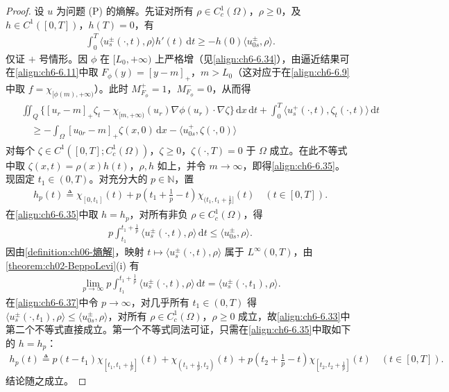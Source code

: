 \documentclass[../../main.tex]{subfiles}%
\begin{document}
\begin{proof}
设 $u$ 为问题 (P) 的熵解。先证对所有 $\rho\in C^1_c(\Omega)$，$\rho\geqslant0$，及 $h\in C^1([0,T])$，$h(T)=0$，有
\begin{align}
\int_0^T\langle u^\pm_s(\cdot,t),\rho\rangle h'(t)\,\mathrm{d}t\geqslant-h(0)\langle u^\pm_{0s},\rho\rangle. \label{align:ch6-6.35}
\end{align}
仅证 $+$ 号情形。因 $\phi$ 在 $[L_0,+\infty)$ 上严格增（见\eqref{align:ch6-6.34}），由逼近结果可在\eqref{align:ch6-6.11}中取 $F_\phi(y)=[y-m]_+$，$m>L_0$（这对应于在\eqref{align:ch6-6.9}中取 $f=\chi_{[\phi(m),+\infty)}$）。此时 $M^+_{F_\phi}=1$，$M^-_{F_\phi}=0$，从而得
\begin{align}
\begin{aligned}
&\iint_Q\{[u_r-m]_+\zeta_t-\chi_{[m,+\infty)}(u_r)\nabla\phi(u_r)\cdot\nabla\zeta\}\,\mathrm{d}x\,\mathrm{d}t
+\int_0^T\langle u^+_s(\cdot,t),\zeta_t(\cdot,t)\rangle\,\mathrm{d}t\\
&\quad\geqslant-\int_\Omega[u_{0r}-m]_+\zeta(x,0)\,\mathrm{d}x-\langle u^+_{0s},\zeta(\cdot,0)\rangle
\end{aligned}
\label{align:ch6-6.36}
\end{align}
对每个 $\zeta\in C^1([0,T];C^1_c(\Omega))$，$\zeta\geqslant0$，$\zeta(\cdot,T)=0$ 于 $\Omega$ 成立。在此不等式中取 $\zeta(x,t)=\rho(x)h(t)$，$\rho,h$ 如上，并令 $m\to\infty$，即得\eqref{align:ch6-6.35}。
现固定 $t_1\in(0,T)$。对充分大的 $p\in\mathbb{N}$，置
\begin{align*}
h_p(t)\triangleq\chi_{[0,t_1]}(t)+p\left(t_1+\frac{1}{p}-t\right)\chi_{(t_1,t_1+\frac{1}{p}]}(t)
\quad(t\in[0,T]).
\end{align*}
在\eqref{align:ch6-6.35}中取 $h=h_p$，对所有非负 $\rho\in C^1_c(\Omega)$，得
\begin{align}
p\int_{t_1}^{t_1+\frac{1}{p}}\langle u^\pm_s(\cdot,t),\rho\rangle\,\mathrm{d}t\leqslant\langle u^\pm_{0s},\rho\rangle. \label{align:ch6-6.37}
\end{align}
因由\cref{definition:ch06-熵解}，映射 $t\mapsto\langle u^\pm_s(\cdot,t),\rho\rangle$ 属于 $L^\infty(0,T)$，由\cref{theorem:ch02-BeppoLevi}(i) 有
\begin{align*}
\lim_{p\to\infty}p\int_{t_1}^{t_1+\frac{1}{p}}\langle u^\pm_s(\cdot,t),\rho\rangle\,\mathrm{d}t
=\langle u^\pm_s(\cdot,t_1),\rho\rangle.
\end{align*}
在\eqref{align:ch6-6.37}中令 $p\to\infty$，对几乎所有 $t_1\in(0,T)$ 得 $\langle u^\pm_s(\cdot,t_1),\rho\rangle\leqslant\langle u^\pm_{0s},\rho\rangle$，对所有 $\rho\in C^1_c(\Omega)$，$\rho\geqslant0$ 成立，故\eqref{align:ch6-6.33}中第二个不等式直接成立。第一个不等式同法可证，只需在\eqref{align:ch6-6.35}中取如下的 $h=h_p$：
\begin{align*}
h_p(t)\triangleq p(t-t_1)\chi_{[t_1,t_1+\frac{1}{p}]}(t)
+\chi_{(t_1+\frac{1}{p},t_2)}(t)
+p\left(t_2+\frac{1}{p}-t\right)\chi_{[t_2,t_2+\frac{1}{p}]}(t)
\quad(t\in[0,T]).
\end{align*}
结论随之成立。
\end{proof}
\end{document}
